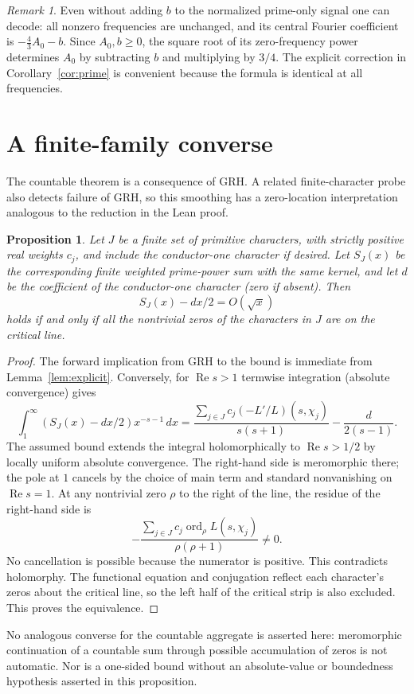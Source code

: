 \documentclass[11pt]{article}
\newtheorem{proposition}[theorem]{Proposition}
\theoremstyle{remark}\newtheorem{remark}[theorem]{Remark}
\newcommand{\ord}{\operatorname{ord}}\newcommand{\Rea}{\operatorname{Re}}\newcommand{\e}{\mathrm e}
\begin{document}
\begin{remark}
Even without adding $b$ to the normalized prime-only signal one can decode: all nonzero frequencies are unchanged, and its central Fourier coefficient is $-\tfrac43 A_0-b$. Since $A_0,b\ge0$, the square root of its zero-frequency power determines $A_0$ by subtracting $b$ and multiplying by $3/4$. The explicit correction in Corollary~\ref{cor:prime} is convenient because the formula is identical at all frequencies.
\end{remark}

\section{A finite-family converse}
The countable theorem is a consequence of GRH. A related finite-character probe also detects failure of GRH, so this smoothing has a zero-location interpretation analogous to the reduction in the Lean proof.
\begin{proposition}\label{prop:converse}
Let $J$ be a finite set of primitive characters, with strictly positive real weights $c_j$, and include the conductor-one character if desired. Let $S_J(x)$ be the corresponding finite weighted prime-power sum with the same kernel, and let $d$ be the coefficient of the conductor-one character (zero if absent). Then
\[
S_J(x)-dx/2=O(\sqrt{x})
\]
holds if and only if all the nontrivial zeros of the characters in $J$ are on the critical line.
\end{proposition}
\begin{proof}
The forward implication from GRH to the bound is immediate from Lemma~\ref{lem:explicit}. Conversely, for $\Rea s>1$ termwise integration (absolute convergence) gives
\[
\int_1^\infty (S_J(x)-dx/2)x^{-s-1}\,dx
=\frac{\sum_{j\in J}c_j(-L'/L)(s,\chi_j)}{s(s+1)}-\frac{d}{2(s-1)}.
\]
The assumed bound extends the integral holomorphically to $\Rea s>1/2$ by locally uniform absolute convergence. The right-hand side is meromorphic there; the pole at $1$ cancels by the choice of main term and standard nonvanishing on $\Rea s=1$. At any nontrivial zero $\rho$ to the right of the line, the residue of the right-hand side is
\[
-\frac{\sum_{j\in J}c_j\ord_\rho L(s,\chi_j)}{\rho(\rho+1)}\ne0.
\]
No cancellation is possible because the numerator is positive. This contradicts holomorphy. The functional equation and conjugation reflect each character's zeros about the critical line, so the left half of the critical strip is also excluded. This proves the equivalence.
\end{proof}
No analogous converse for the countable aggregate is asserted here: meromorphic continuation of a countable sum through possible accumulation of zeros is not automatic. Nor is a one-sided bound without an absolute-value or boundedness hypothesis asserted in this proposition.
\end{document}
